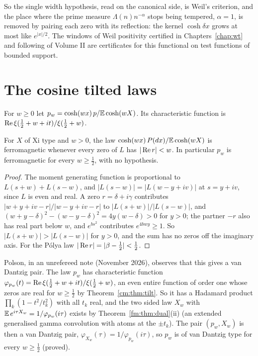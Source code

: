 So the single width hypothesis, read on the canonical side, is Weil's criterion, and the place where the prime measure $\Lambda(n)n^{-\alpha}$ stops being tempered, $\alpha=1$, is removed by pairing each zero with its reflection: the kernel $\cosh\delta x$ grows at most like $e^{|x|/2}$. The windows of Weil positivity certified in Chapters~\ref{chap:wt} and following of Volume II are certificates for this functional on test functions of bounded support.

\section{The cosine tilted laws}\label{cm:sec:tilt}

For $w\ge0$ let $p_w=\cosh(wx)\,p/\mathbb{E}\cosh(wX)$. Its characteristic function is $\operatorname{Re}\xi(\frac12+w+it)/\xi(\frac12+w)$.

\begin{theorem}\label{cm:thm:tilt}
For $X$ of Xi type and $w>0$, the law $\cosh(wx)\,P(dx)/\mathbb{E}\cosh(wX)$ is ferromagnetic whenever every zero of $L$ has $|\operatorname{Re} r|<w$. In particular $p_w$ is ferromagnetic for every $w\ge\frac12$, with no hypothesis.
\end{theorem}

\begin{proof}
The moment generating function is proportional to $L(s+w)+L(s-w)$, and $|L(s-w)|=|L(w-y+iv)|$ at $s=y+iv$, since $L$ is even and real. A zero $r=\delta+i\gamma$ contributes $|w+y+iv-r|/|w-y+iv-r|$ to $|L(s+w)|/|L(s-w)|$, and $(w+y-\delta)^2-(w-y-\delta)^2=4y(w-\delta)>0$ for $y>0$; the partner $-r$ also has real part below $w$, and $e^{bs^2}$ contributes $e^{4bwy}\ge1$. So $|L(s+w)|>|L(s-w)|$ for $y>0$, and the sum has no zeros off the imaginary axis. For the P\'olya law $|\operatorname{Re} r|=|\beta-\frac12|<\frac12$.
\end{proof}

Polson, in an unrefereed note (November 2026), observes that this gives a van Dantzig pair. The law $p_w$ has characteristic function $\varphi_{p_w}(t)=\operatorname{Re}\xi(\frac12+w+it)/\xi(\frac12+w)$, an even entire function of order one whose zeros are real for $w\ge\frac12$ by Theorem~\ref{cm:thm:tilt}. So it has a Hadamard product $\prod_k(1-t^2/t_k^2)$ with all $t_k$ real, and the two sided law $X_w$ with $\mathbb{E}\,e^{i\tau X_w}=1/\varphi_{p_w}(i\tau)$ exists by Theorem~\ref{fm:thm:dual}(ii) (an extended generalised gamma convolution with atoms at the $\pm t_k$). The pair $(p_w,X_w)$ is then a van Dantzig pair, $\varphi_{X_w}(\tau)=1/\varphi_{p_w}(i\tau)$, so $p_w$ is of van Dantzig type for every $w\ge\frac12$ (proved).

